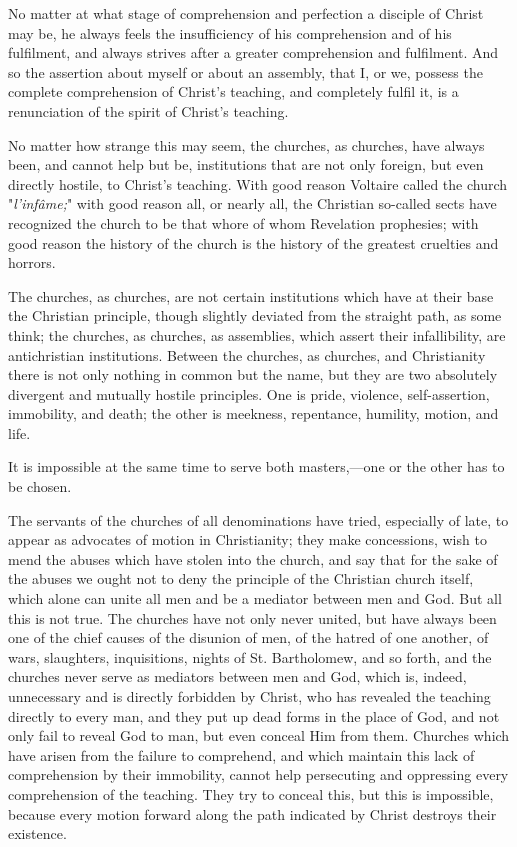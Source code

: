 \documentclass{book}
\begin{document}
No matter at what stage of comprehension and perfection a disciple of Christ may be, he always feels the insufficiency of his comprehension and of his fulfilment, and always strives after a greater comprehension and fulfilment. And so the assertion about myself or about an assembly, that I, or we, possess the complete comprehension of Christ’s teaching, and completely fulfil it, is a renunciation of the spirit of Christ’s teaching.

No matter how strange this may seem, the churches, as churches, have always been, and cannot help but be, institutions that are not only foreign, but even directly hostile, to Christ’s teaching. With good reason Voltaire called the church "\emph{l’infâme;}" with good reason all, or nearly all, the Christian so-called sects have recognized the church to be that whore of whom Revelation prophesies; with good reason the history of the church is the history of the greatest cruelties and horrors.

The churches, as churches, are not certain institutions which have at their base the Christian principle, though slightly deviated from the straight path, as some think; the churches, as churches, as assemblies, which assert their infallibility, are antichristian institutions. Between the churches, as churches, and Christianity there is not only nothing in common but the name, but they are two absolutely divergent and mutually hostile principles. One is pride, violence, self-assertion, immobility, and death; the other is meekness, repentance, humility, motion, and life.

It is impossible at the same time to serve both masters,—one or the other has to be chosen.

The servants of the churches of all denominations have tried, especially of late, to appear as advocates of motion in Christianity; they make concessions, wish to mend the abuses which have stolen into the church, and say that for the sake of the abuses we ought not to deny the principle of the Christian church itself, which alone can unite all men and be a mediator between men and God. But all this is not true. The churches have not only never united, but have always been one of the chief causes of the disunion of men, of the hatred of one another, of wars, slaughters, inquisitions, nights of St. Bartholomew, and so forth, and the churches never serve as mediators between men and God, which is, indeed, unnecessary and is directly forbidden by Christ, who has revealed the teaching directly to every man, and they put up dead forms in the place of God, and not only fail to reveal God to man, but even conceal Him from them. Churches which have arisen from the failure to comprehend, and which maintain this lack of comprehension by their immobility, cannot help persecuting and oppressing every comprehension of the teaching. They try to conceal this, but this is impossible, because every motion forward along the path indicated by Christ destroys their existence.
\end{document}

